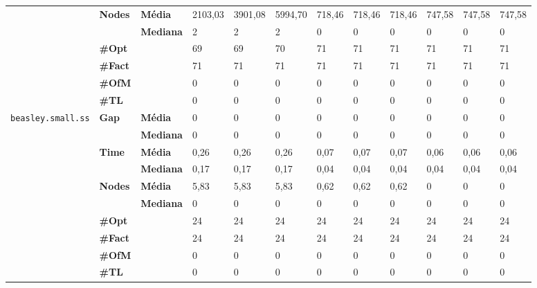 \begin{footnotesize}
\begin{tabular}{c@{\hskip 0.2cm}l@{\hskip 0.1cm}l|lll|lll|lll}
\cline{2-12}
 & \multirow{2}{*}{\textbf{Nodes}} & \textbf{Média} & 2103,03 & 3901,08 & 5994,70 & 718,46 & 718,46 & 718,46 & 747,58 & 747,58 & 747,58 \\
 & & \textbf{Mediana} & 2 & 2 & 2 & 0 & 0 & 0 & 0 & 0 & 0 \\
\cline{2-12}
 & \textbf{\#Opt} & & 69 & 69 & 70 & 71 & 71 & 71 & 71 & 71 & 71 \\
 & \textbf{\#Fact} & & 71 & 71 & 71 & 71 & 71 & 71 & 71 & 71 & 71 \\
 & \textbf{\#OfM} & & 0 & 0 & 0 & 0 & 0 & 0 & 0 & 0 & 0 \\
 & \textbf{\#TL} & & 0 & 0 & 0 & 0 & 0 & 0 & 0 & 0 & 0 \\
\hline
\multirow{7}{*}{\texttt{beasley.small.ss}} & \multirow{2}{*}{\textbf{Gap}} & \textbf{Média} & 0 & 0 & 0 & 0 & 0 & 0 & 0 & 0 & 0 \\
 & & \textbf{Mediana} & 0 & 0 & 0 & 0 & 0 & 0 & 0 & 0 & 0 \\
\cline{2-12}
 & \multirow{2}{*}{\textbf{Time}} & \textbf{Média} & 0,26 & 0,26 & 0,26 & 0,07 & 0,07 & 0,07 & 0,06 & 0,06 & 0,06 \\
 & & \textbf{Mediana} & 0,17 & 0,17 & 0,17 & 0,04 & 0,04 & 0,04 & 0,04 & 0,04 & 0,04 \\
\cline{2-12}
 & \multirow{2}{*}{\textbf{Nodes}} & \textbf{Média} & 5,83 & 5,83 & 5,83 & 0,62 & 0,62 & 0,62 & 0 & 0 & 0 \\
 & & \textbf{Mediana} & 0 & 0 & 0 & 0 & 0 & 0 & 0 & 0 & 0 \\
\cline{2-12}
 & \textbf{\#Opt} & & 24 & 24 & 24 & 24 & 24 & 24 & 24 & 24 & 24 \\
 & \textbf{\#Fact} & & 24 & 24 & 24 & 24 & 24 & 24 & 24 & 24 & 24 \\
 & \textbf{\#OfM} & & 0 & 0 & 0 & 0 & 0 & 0 & 0 & 0 & 0 \\
 & \textbf{\#TL} & & 0 & 0 & 0 & 0 & 0 & 0 & 0 & 0 & 0 \\
	\end{tabular}
	\end{footnotesize}


